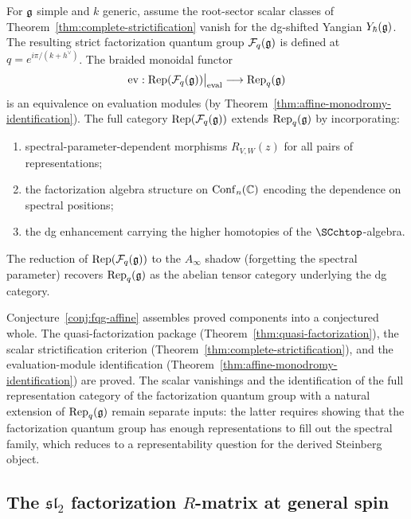 \begin{conjecture}
\label{conj:fqg-affine}
For $\mathfrak{g}$ simple and $k$ generic, assume the root-sector scalar
classes of Theorem~\textup{\ref{thm:complete-strictification}} vanish
for the dg-shifted Yangian $Y_\hbar(\mathfrak{g})$. The resulting strict
factorization quantum group $\mathcal{F}_q(\mathfrak{g})$ is defined at
$q = e^{i\pi/(k+h^\vee)}$. The braided monoidal functor
\[
 \mathrm{ev}: \mathrm{Rep}(\mathcal{F}_q(\mathfrak{g}))\big|_{\mathrm{eval}} \longrightarrow \mathrm{Rep}_q(\mathfrak{g})
\]
is an equivalence on evaluation modules (by Theorem~\textup{\ref{thm:affine-monodromy-identification}}). The full category $\mathrm{Rep}(\mathcal{F}_q(\mathfrak{g}))$ extends $\mathrm{Rep}_q(\mathfrak{g})$ by incorporating:
\begin{enumerate}[label=\textup{(\roman*)}]
 \item spectral-parameter-dependent morphisms $R_{V,W}(z)$ for all pairs of representations;
 \item the factorization algebra structure on $\mathrm{Conf}_n(\mathbb C)$ encoding the dependence on spectral positions;
 \item the dg enhancement carrying the higher homotopies of the $\SCchtop$-algebra.
\end{enumerate}
The reduction of $\mathrm{Rep}(\mathcal{F}_q(\mathfrak{g}))$ to the $A_\infty$ shadow (forgetting the spectral parameter) recovers $\mathrm{Rep}_q(\mathfrak{g})$ as the abelian tensor category underlying the dg category.
\end{conjecture}

\begin{remark}
Conjecture~\ref{conj:fqg-affine} assembles proved components into a
conjectured whole. The quasi-factorization package
(Theorem~\ref{thm:quasi-factorization}), the scalar strictification
criterion (Theorem~\ref{thm:complete-strictification}), and the
evaluation-module identification
(Theorem~\ref{thm:affine-monodromy-identification}) are proved. The
scalar vanishings and the identification of the full representation
category of the factorization quantum group with a natural extension
of $\mathrm{Rep}_q(\mathfrak{g})$ remain separate inputs: the latter requires
showing that the factorization quantum group has enough
representations to fill out the spectral family, which reduces to a
representability question for the derived Steinberg object.
\end{remark}

\subsection{The $\mathfrak{sl}_2$ factorization $R$-matrix at general spin}
\label{subsec:sl2-factorization-R}

